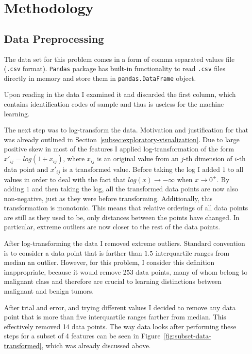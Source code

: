 \documentclass[10pt, a4paper]{article}
\begin{document}
\section{Methodology}

\subsection{Data Preprocessing}

The data set for this problem comes in a form of comma separated values file (\texttt{.csv} format). \texttt{Pandas} package has built-in functionality to read \texttt{.csv} files directly in memory and store them in \texttt{pandas.DataFrame} object.

Upon reading in the data I examined it and discarded the first column, which contains identification codes of sample and thus is useless for the machine learning.

The next step was to log-transform the data. Motivation and justification for that was already outlined in Section~\ref{subsec:exploratory-visualization}. Due to large positive skew in most of the features I applied log-transformation of the form $x'_{ij}=log(1+x_{ij})$, where $x_{ij}$ is an original value from an $j$-th dimension of $i$-th data point and $x'_{ij}$ is a transformed value. Before taking the log I added $1$ to all values in order to deal with the fact that $log(x)\rightarrow-\infty$ when $x\rightarrow0^+$. By adding $1$ and then taking the log, all the transformed data points are now also non-negative, just as they were before transforming. Additionally, this transformation is monotonic. This means that relative orderings of all data points are still as they used to be, only distances between the points have changed. In particular, extreme outliers are now closer to the rest of the data points. 

After log-transforming the data I removed extreme outliers. Standard convention is to consider a data point that is farther than $1.5$ interquartile ranges from median an outlier. However, for this problem, I consider this definition inappropriate, because it would remove 253 data points, many of whom belong to malignant class and therefore are crucial to learning distinctions between malignant and benign tumors.

After trial and error, and trying different values I decided to remove any data point that is more than five interquartile ranges farther from median. This effectively removed 14 data points. The way data looks after performing these steps for a subset of 4 features can be seen in Figure~\ref{fig:subset-data-transformed}, which was already discussed above.
\end{document}
